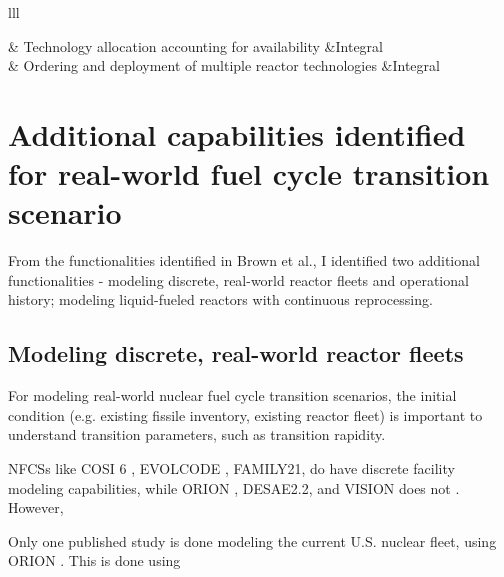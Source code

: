 \begin{table}[h]
\begin{tabular}{lll}
        \hline

         & Technology allocation accounting for availability &Integral \\
        	& Ordering and deployment of multiple reactor technologies &Integral \\
        \hline
    \end{tabular}
\end{table}

\section{Additional capabilities identified for real-world fuel cycle transition scenario}
From the functionalities identified in Brown et al., I identified two additional functionalities -
modeling discrete, real-world reactor fleets and operational history; modeling liquid-fueled
reactors with continuous reprocessing.

\subsection{Modeling discrete, real-world reactor fleets}
For modeling real-world nuclear fuel cycle transition scenarios, the initial
condition (e.g. existing fissile inventory, existing reactor fleet) is important
to understand transition parameters, such as transition rapidity.

\glspl{NFCS} like COSI 6 \cite{meyer_new_2009}, EVOLCODE \cite{alvaerz-velarde_validation_2014},
FAMILY21,
do have discrete facility modeling capabilities, while ORION \cite{},
DESAE2.2\cite{tsibulskiy_desae_2006}, and VISION \cite{jacobson_verifiable_2010} does not \cite{boucher_international_2010}.
However,

Only one published study is done modeling the current U.S. nuclear fleet,
using ORION \cite{sunny_transition_2015}. This is done using 





